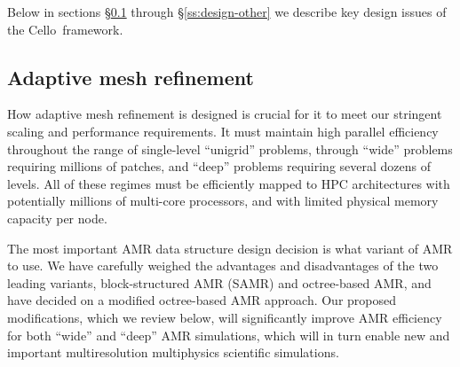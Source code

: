 \documentclass[11pt,letterpaper]{article}
\newcommand{\cello}{\textsf{Cello}}
\newcommand{\chombo}{\textsf{Chombo}}
\newcommand{\samrai}{\textsf{SAMRAI}}
\begin{document}
Below in sections \S\ref{ss:design-amr} through
\S\ref{ss:design-other} we describe key design issues of the \cello\
framework.

\subsection{Adaptive mesh refinement} \label{ss:design-amr}

How adaptive mesh refinement is designed is crucial for it to meet our
stringent scaling and performance requirements.  It must maintain high
parallel efficiency throughout the range of single-level ``unigrid''
problems, through ``wide'' problems requiring millions of patches, and
``deep'' problems requiring several dozens of levels.  All of these
regimes must be efficiently mapped to HPC architectures with
potentially millions of multi-core processors, and with limited
physical memory capacity per node.

The most important AMR data structure design decision is what variant
of AMR to use.  We have carefully weighed the advantages and
disadvantages of the two leading variants, block-structured AMR (SAMR)
and octree-based AMR, and have decided on a modified octree-based AMR
approach.  Our proposed modifications, which we review below, will
significantly improve AMR efficiency for both ``wide'' and ``deep''
AMR simulations, which will in turn enable new and important
multiresolution multiphysics scientific simulations.

\end{document}
